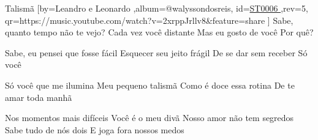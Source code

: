 \beginsong
{Talismã %
}[by={Leandro e Leonardo %
},album={@walyssondosreis},
id={\href{https://music.youtube.com/watch?v=2xrppJrllv8&feature=share %
}{ST0006 %
}},rev={5}, %
qr={https://music.youtube.com/watch?v=2xrppJrllv8&feature=share %
}]
\beginverse
Sabe, quanto tempo não te vejo?
Cada vez você distante
Mas eu gosto de você
Por quê?
\endverse

\beginverse
Sabe, eu pensei que fosse fácil
Esquecer seu jeito frágil
De se dar sem receber
Só você
\endverse

\beginverse
Só você que me ilumina
Meu pequeno talismã
Como é doce essa rotina
De te amar toda manhã
\endverse

\beginverse
Nos momentos mais difíceis
Você é o meu divã
Nosso amor não tem segredos
Sabe tudo de nós dois
E joga fora nossos medos
\endverse


